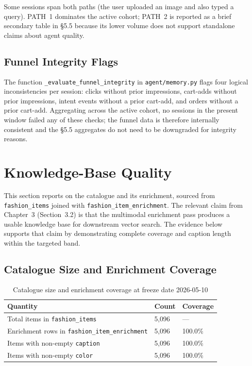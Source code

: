 Some sessions span both paths (the user uploaded an image and also typed a query). PATH~1 dominates the active cohort; PATH~2 is reported as a brief secondary table in §5.5 because its lower volume does not support standalone claims about agent quality.

\subsection{Funnel Integrity Flags}
\label{subsec:funnel_integrity}

The function \texttt{\_evaluate\_funnel\_integrity} in \texttt{agent/memory.py} flags four logical inconsistencies per session: clicks without prior impressions, cart-adds without prior impressions, intent events without a prior cart-add, and orders without a prior cart-add. Aggregating across the active cohort, no sessions in the present window failed any of these checks; the funnel data is therefore internally consistent and the §5.5 aggregates do not need to be downgraded for integrity reasons.



\section{Knowledge-Base Quality}
\label{sec:kb_quality}

This section reports on the catalogue and its enrichment, sourced from \texttt{fashion\_items} joined with \texttt{fashion\_item\_enrichment}. The relevant claim from Chapter~3 (Section~3.2) is that the multimodal enrichment pass produces a usable knowledge base for downstream vector search. The evidence below supports that claim by demonstrating complete coverage and caption length within the targeted band.

\subsection{Catalogue Size and Enrichment Coverage}
\label{subsec:enrichment_coverage}

\begin{table}[H]
\centering
\begin{tabular}{p{6.5cm}p{3cm}p{3cm}}
\toprule
\textbf{Quantity} & \textbf{Count} & \textbf{Coverage}\\
\midrule
Total items in \texttt{fashion\_items} & 5,096 & ---\\
Enrichment rows in \texttt{fashion\_item\_enrichment} & 5,096 & 100.0\%\\
Items with non-empty \texttt{caption} & 5,096 & 100.0\%\\
Items with non-empty \texttt{color} & 5,096 & 100.0\%\\
\bottomrule
\end{tabular}
\caption{Catalogue size and enrichment coverage at freeze date 2026-05-10}
\label{tab:enrichment_coverage}
\end{table}

